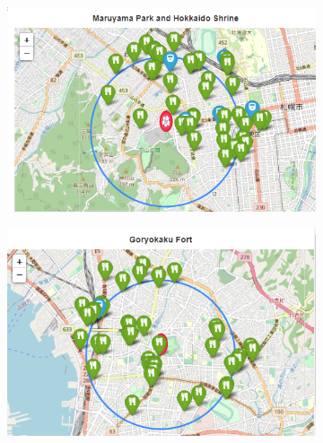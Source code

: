 \documentclass[11pt]{article}
\begin{document}
\begin{figure}[H]
  \centering
  \begin{subfigure}[t]{0.45\textwidth}
    \centering
    \includegraphics[width=\textwidth]{images/Maruyama Park and Hokkaido Shrine_venues.png}
  \end{subfigure}
  \hfill
  \begin{subfigure}[t]{0.45\textwidth}
    \centering
    \includegraphics[width=\textwidth]{images/Goryokaku Fort_venues.png}
  \end{subfigure}


\end{figure}
\end{document}

